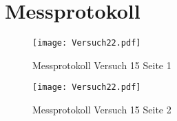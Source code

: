 
\section{Messprotokoll}
\begin{figure}[h!]
    \centering
    \texttt{[image: Versuch22.pdf]}
    \caption{Messprotokoll Versuch 15 Seite 1}
\end{figure}
\clearpage
\newpage
\begin{figure}[h!]
    \centering
    \texttt{[image: Versuch22.pdf]}
    \caption{Messprotokoll Versuch 15 Seite 2}
\end{figure}

\newpage